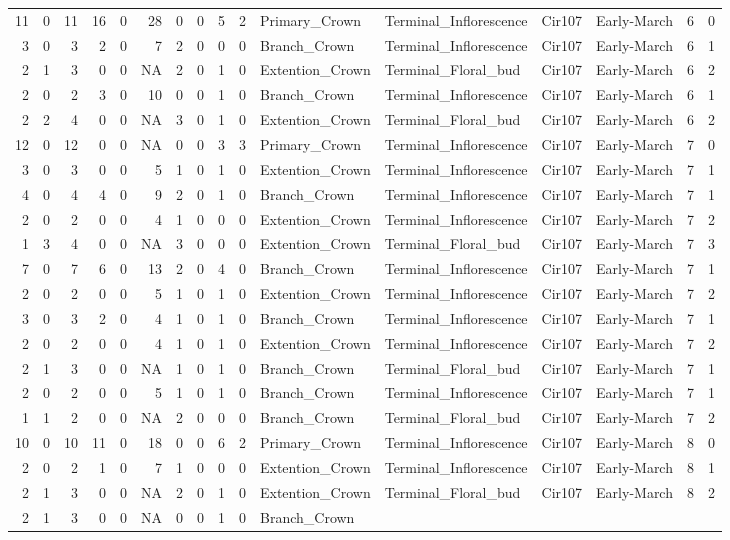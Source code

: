 \documentclass[]{article}
\begin{document}
\begin{longtable}[]{@{}rrrrrrrrrrllllrl@{}}
11 & 0 & 11 & 16 & 0 & 28 & 0 & 0 & 5 & 2 & Primary\_Crown &
Terminal\_Inflorescence & Cir107 & Early-March & 6 & 0\tabularnewline
3 & 0 & 3 & 2 & 0 & 7 & 2 & 0 & 0 & 0 & Branch\_Crown &
Terminal\_Inflorescence & Cir107 & Early-March & 6 & 1\tabularnewline
2 & 1 & 3 & 0 & 0 & NA & 2 & 0 & 1 & 0 & Extention\_Crown &
Terminal\_Floral\_bud & Cir107 & Early-March & 6 & 2\tabularnewline
2 & 0 & 2 & 3 & 0 & 10 & 0 & 0 & 1 & 0 & Branch\_Crown &
Terminal\_Inflorescence & Cir107 & Early-March & 6 & 1\tabularnewline
2 & 2 & 4 & 0 & 0 & NA & 3 & 0 & 1 & 0 & Extention\_Crown &
Terminal\_Floral\_bud & Cir107 & Early-March & 6 & 2\tabularnewline
12 & 0 & 12 & 0 & 0 & NA & 0 & 0 & 3 & 3 & Primary\_Crown &
Terminal\_Inflorescence & Cir107 & Early-March & 7 & 0\tabularnewline
3 & 0 & 3 & 0 & 0 & 5 & 1 & 0 & 1 & 0 & Extention\_Crown &
Terminal\_Inflorescence & Cir107 & Early-March & 7 & 1\tabularnewline
4 & 0 & 4 & 4 & 0 & 9 & 2 & 0 & 1 & 0 & Branch\_Crown &
Terminal\_Inflorescence & Cir107 & Early-March & 7 & 1\tabularnewline
2 & 0 & 2 & 0 & 0 & 4 & 1 & 0 & 0 & 0 & Extention\_Crown &
Terminal\_Inflorescence & Cir107 & Early-March & 7 & 2\tabularnewline
1 & 3 & 4 & 0 & 0 & NA & 3 & 0 & 0 & 0 & Extention\_Crown &
Terminal\_Floral\_bud & Cir107 & Early-March & 7 & 3\tabularnewline
7 & 0 & 7 & 6 & 0 & 13 & 2 & 0 & 4 & 0 & Branch\_Crown &
Terminal\_Inflorescence & Cir107 & Early-March & 7 & 1\tabularnewline
2 & 0 & 2 & 0 & 0 & 5 & 1 & 0 & 1 & 0 & Extention\_Crown &
Terminal\_Inflorescence & Cir107 & Early-March & 7 & 2\tabularnewline
3 & 0 & 3 & 2 & 0 & 4 & 1 & 0 & 1 & 0 & Branch\_Crown &
Terminal\_Inflorescence & Cir107 & Early-March & 7 & 1\tabularnewline
2 & 0 & 2 & 0 & 0 & 4 & 1 & 0 & 1 & 0 & Extention\_Crown &
Terminal\_Inflorescence & Cir107 & Early-March & 7 & 2\tabularnewline
2 & 1 & 3 & 0 & 0 & NA & 1 & 0 & 1 & 0 & Branch\_Crown &
Terminal\_Floral\_bud & Cir107 & Early-March & 7 & 1\tabularnewline
2 & 0 & 2 & 0 & 0 & 5 & 1 & 0 & 1 & 0 & Branch\_Crown &
Terminal\_Inflorescence & Cir107 & Early-March & 7 & 1\tabularnewline
1 & 1 & 2 & 0 & 0 & NA & 2 & 0 & 0 & 0 & Branch\_Crown &
Terminal\_Floral\_bud & Cir107 & Early-March & 7 & 2\tabularnewline
10 & 0 & 10 & 11 & 0 & 18 & 0 & 0 & 6 & 2 & Primary\_Crown &
Terminal\_Inflorescence & Cir107 & Early-March & 8 & 0\tabularnewline
2 & 0 & 2 & 1 & 0 & 7 & 1 & 0 & 0 & 0 & Extention\_Crown &
Terminal\_Inflorescence & Cir107 & Early-March & 8 & 1\tabularnewline
2 & 1 & 3 & 0 & 0 & NA & 2 & 0 & 1 & 0 & Extention\_Crown &
Terminal\_Floral\_bud & Cir107 & Early-March & 8 & 2\tabularnewline
2 & 1 & 3 & 0 & 0 & NA & 0 & 0 & 1 & 0 & Branch\_Crown &

\end{longtable}
\end{document}
